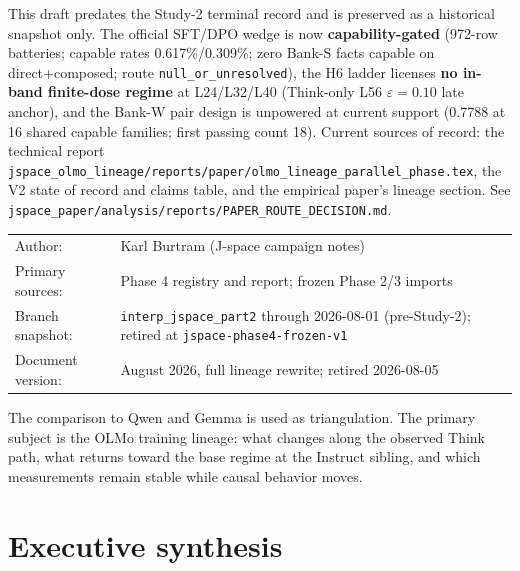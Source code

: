 \documentclass[11pt]{article}
\begin{document}
\begin{titlepage}
\vspace{0.18in}
\begin{tcolorbox}[colback=red!4!white,colframe=red!55!black,
  title={RETIRED AS A STANDALONE PAPER (2026-08-05, paper-route decision)}]
This draft predates the Study-2 terminal record and is preserved as a
historical snapshot only. The official SFT/DPO wedge is now
\textbf{capability-gated} (972-row batteries; capable rates
0.617\%/0.309\%; zero Bank-S facts capable on direct+composed; route
\texttt{null\_or\_unresolved}), the H6 ladder licenses \textbf{no
in-band finite-dose regime} at L24/L32/L40 (Think-only L56
$\varepsilon{=}0.10$ late anchor), and the Bank-W pair design is
unpowered at current support (0.7788 at 16 shared capable families;
first passing count 18). Current sources of record: the technical
report \texttt{jspace\_olmo\_lineage/reports/paper/olmo\_lineage\_parallel\_phase.tex},
the V2 state of record and claims table, and the empirical paper's
lineage section. See
\texttt{jspace\_paper/analysis/reports/PAPER\_ROUTE\_DECISION.md}.
\end{tcolorbox}

\vfill
\begin{tabular}{@{}ll@{}}
Author: & Karl Burtram (J-space campaign notes)\\
Primary sources: & Phase 4 registry and report; frozen Phase 2/3 imports\\
Branch snapshot: & \texttt{interp\_jspace\_part2} through 2026-08-01 (pre-Study-2); retired at \texttt{jspace-phase4-frozen-v1}\\
Document version: & August 2026, full lineage rewrite; retired 2026-08-05\\
\end{tabular}

\vspace{0.22in}
{\small\color{slate}
The comparison to Qwen and Gemma is used as triangulation. The primary subject
is the OLMo training lineage: what changes along the observed Think path, what
returns toward the base regime at the Instruct sibling, and which measurements
remain stable while causal behavior moves.}

\end{titlepage}

\hypersetup{pageanchor=true}
\tableofcontents
\clearpage
{}

\section*{Executive synthesis}
\end{document}
